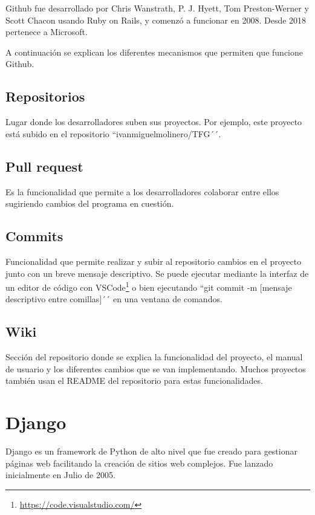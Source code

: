 \documentclass[a4paper, 12pt]{book}
\begin{document}
Github fue desarrollado por Chris Wanstrath, P. J. Hyett, Tom Preston-Werner y Scott Chacon usando Ruby on Rails, y comenzó a funcionar en 2008. Desde 2018 pertenece a Microsoft.

A continuación se explican los diferentes mecanismos que permiten que funcione Github.

\subsection{Repositorios}

Lugar donde los desarrolladores suben sus proyectos. Por ejemplo, este proyecto está subido en el repositorio ``ivanmiguelmolinero/TFG´´.

\subsection{Pull request}

Es la funcionalidad que permite a los desarrolladores colaborar entre ellos sugiriendo cambios del programa en cuestión.

\subsection{Commits}

Funcionalidad que permite realizar y subir al repositorio cambios en el proyecto junto con un breve mensaje descriptivo. Se puede ejecutar mediante la interfaz de un editor de código con VSCode\footnote{\url{https://code.visualstudio.com/}} o bien ejecutando ``git commit -m [mensaje descriptivo entre comillas]´´ en una ventana de comandos.

\subsection{Wiki}

Sección del repositorio donde se explica la funcionalidad del proyecto, el manual de usuario y los diferentes cambios que se van implementando. Muchos proyectos también usan el README del repositorio para estas funcionalidades.

\section{Django}
\label{sec:django}

Django es un framework de Python de alto nivel que fue creado para gestionar páginas web facilitando la creación de sitios web complejos. Fue lanzado inicialmente en Julio de 2005. 
\end{document}

